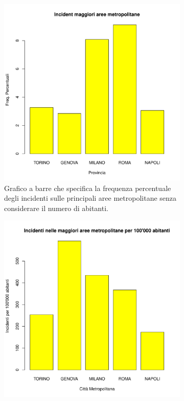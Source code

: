 \documentclass[12pt,a4paper,final,oneside]{article}			%
\begin{document}
        \begin{figure}[h!]
            \begin{subfigure}{0.48\textwidth}
                \centering
                \includegraphics[scale=0.4]{../results/incidenti_maggiori_aree_metropolitane.pdf}
                \caption{Grafico a barre che specifica la frequenza percentuale degli incidenti sulle principali aree metropolitane senza considerare il numero di abitanti.}
                \label{Fig: citta_metropolitane_tot}
            \end{subfigure}
            \hfill
            \begin{subfigure}{0.48\textwidth}
                \centering
                \includegraphics[scale=0.4]{../results/incidenti_per_abitante_aree_metropolinate.pdf}

\end{subfigure}
\end{figure}
\end{document}
